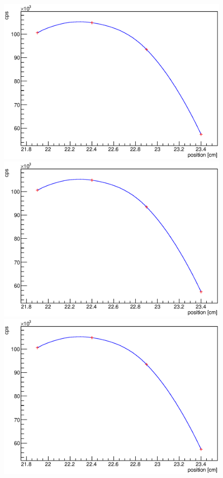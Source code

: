 \begin{figure}
	\begin{minipage}[d]{0.24 \textwidth}
		  \includegraphics[width=\textwidth]{graphics/cobalt/modules/2A.eps}
	\end{minipage}
	\begin{minipage}[d]{0.24 \textwidth}
		  \includegraphics[width=\textwidth]{graphics/cobalt/modules/2A.eps}
	\end{minipage}
	\begin{minipage}[d]{0.24 \textwidth}
		  \includegraphics[width=\textwidth]{graphics/cobalt/modules/6A.eps}

\end{minipage}
\end{figure}
